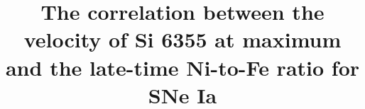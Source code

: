 \documentclass[twocolumn]{aastex631}
\begin{document}
\title{The correlation between the velocity of Si 6355 at maximum and the late-time Ni-to-Fe ratio for SNe Ia}


\end{document}
